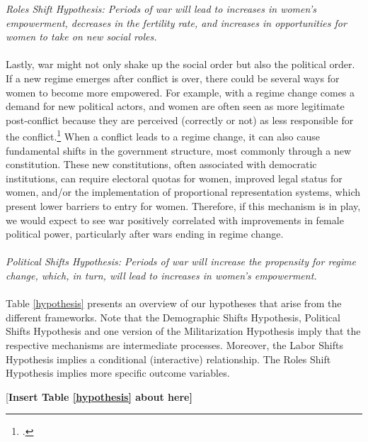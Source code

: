 \documentclass [12pt] {article}
\begin{document}
\emph{Roles Shift Hypothesis: Periods of war will lead to increases in women's empowerment, decreases in the fertility rate, and increases in opportunities for women to take on new social roles.} \\ \\

Lastly, war might not only shake up the social order but also the political order. If a new regime emerges after conflict is over, there could be several ways for women to become more empowered. For example, with a regime change comes a demand for new political actors, and women are often seen as more legitimate post-conflict because they are perceived (correctly or not) as less responsible for the conflict.\footnote{.} When a conflict leads to a regime change, it can also cause fundamental shifts in the government structure, most commonly through a new constitution. These new constitutions, often associated with democratic institutions, can require electoral quotas for women, improved legal status for women, and/or the implementation of proportional representation systems, which present lower barriers to entry for women. Therefore, if this mechanism is in play, we would expect to see war positively correlated with improvements in female political power, particularly after wars ending in regime change.\\  \\

\emph{Political Shifts Hypothesis: Periods of war will increase the propensity for regime change, which, in turn, will lead to increases in women's empowerment.} \\ \\

Table \ref{hypothesis} presents an overview of our hypotheses that arise from the different frameworks. Note that the Demographic Shifts Hypothesis, Political Shifts Hypothesis and one version of the Militarization Hypothesis imply that the respective mechanisms are intermediate processes. Moreover, the Labor Shifts Hypothesis implies a conditional (interactive) relationship. The Roles Shift Hypothesis implies more specific outcome variables.\\ 

\begin{center}
[\bf Insert Table \ref{hypothesis} about here]
\end{center}
\vspace*{.2in}

\end{document}
